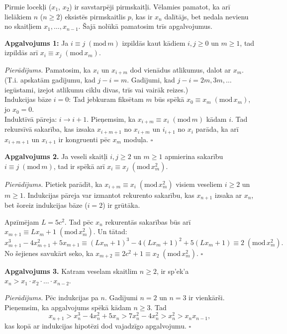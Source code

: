 \documentclass[11pt]{article}
\begin{document}
Pirmie locekļi ($x_1$, $x_2$) ir savstarpēji pirmskaitļi. 
Vēlamies pamatot, ka arī lielākiem $n$ ($n \geq 2$) 
eksistēs pirmskaitlis $p$, kas ir $x_n$ dalītājs, 
bet nedala nevienu no skaitļiem $x_1,\ldots,x_{n-1}$. 
Šajā nolūkā pamatosim trīs apgalvojumus. 

{\bf Apgalvojums 1:} Ja $i\equiv{}j\;(\mbox{mod}\,m)$ izpildās
kaut kādiem $i,j \geq 0$ un $m \geq 1$, tad izpildās arī
$x_i \equiv x_j\;(\mbox{mod}\,x_m)$. 

{\em Pierādījums.} Pamatosim, 
ka $x_i$ un $x_{i+m}$ dod vienādus
atlikumus, dalot ar $x_m$. (T.i. apskatām gadījumu, kad $j-i = m$. 
Gadījumi, kad $j-i = 2m, 3m, \ldots$ iegūstami, izejot atlikumu ciklu 
divas, trīs vai vairāk reizes.)\\
Indukcijas bāze $i = 0$: Tad jebkuram fiksētam $m$ būs 
spēkā $x_0 \equiv x_m\;(\mbox{mod}\,x_m)$, jo $x_0=0$.\\
Induktīvā pāreja: $i \rightarrow i+1$. Pieņemsim, ka 
$x_{i+m} \equiv x_i\;(\mbox{mod}\,m)$ kādam $i$. 
Tad rekursīvā sakarība, kas izsaka $x_{i+m+1}$ no $x_{i+m}$ un 
$i_{i+1}$ no $x_i$ parāda, ka arī $x_{i+m+1}$ un $x_{i+1}$ ir
kongruenti pēc $x_m$ moduļa. $\square$

{\bf Apgalvojums 2.} 
Ja veseli skaitļi $i,j \geq 2$ un $m \geq 1$ apmierina 
sakarību $i \equiv j\;(\mbox{mod}\,m)$, tad 
ir spēkā arī $x_i \equiv x_j\;(\mbox{mod}\,x_m^2)$. 

{\em Pierādījums.} Pietiek parādīt, ka $x_{i+m} \equiv x_i\;(\mbox{mod}\,x_m^2)$
visiem veseliem $i \geq 2$ un $m \geq 1$. Indukcijas pāreja var izmantot 
rekurento sakarību, kas $x_{n+1}$ izsaka ar $x_n$, bet šoreiz 
indukcijas bāze ($i=2$) ir grūtāka. 

Apzīmējam $L= 5c^2$. Tad pēc $x_n$ rekurentās sakarības būs arī
$x_{m+1} \equiv Lx_m + 1\;(\mbox{mod}\,x_m^2)$. Un tātad:
$$x_{m+1}^3 - 4x_{m+1}^2 + 5x_{m+1} \equiv (Lx_m + 1)^3 - 4(Lx_m + 1)^2 + 5(Lx_m+1)
\equiv 2\;(\mbox{mod}\,x_m^2).$$
No šejienes savukārt seko, ka 
$x_{m+2} \equiv 2c^2 + 1 \equiv x_2\;(\mbox{mod}\,x_m^2)$. $\square$


{\bf Apgalvojums 3.} Katram veselam skaitlim $n \geq 2$, ir sp'ek'a 
$x_n > x_1 \cdot x_2 \cdot \ldots \cdot x_{n-2}$. 

{\em Pierādījums.} Pēc indukcijas pa $n$. Gadījumi $n=2$ un $n=3$ ir vienkārši. 
Pieņemsim, ka apgalvojums spēkā kādam $n \geq 3$. Tad 
$$x_{n+1} > x_n^3 - 4x_n^2 + 5x_n > 7x_n^2 - 4x_n^2 > x_n^2 > x_nx_{n-1},$$
kas kopā ar indukcijas hipotēzi dod vajadzīgo apgalvojumu. $\square$
\end{document}
